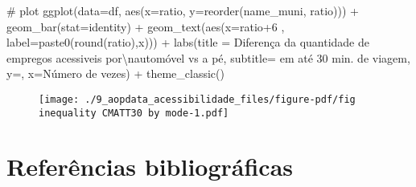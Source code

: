 \documentclass[
  letterpaper,
  DIV=11,
  numbers=noendperiod]{scrreprt}
\newenvironment{Shaded}{\begin{snugshade}}{\end{snugshade}}
\newcommand{\AttributeTok}[1]{\textcolor[rgb]{0.40,0.45,0.13}{#1}}
\newcommand{\CommentTok}[1]{\textcolor[rgb]{0.37,0.37,0.37}{#1}}
\newcommand{\DecValTok}[1]{\textcolor[rgb]{0.68,0.00,0.00}{#1}}
\newcommand{\FunctionTok}[1]{\textcolor[rgb]{0.28,0.35,0.67}{#1}}
\newcommand{\NormalTok}[1]{\textcolor[rgb]{0.00,0.23,0.31}{#1}}
\newcommand{\SpecialCharTok}[1]{\textcolor[rgb]{0.37,0.37,0.37}{#1}}
\newcommand{\StringTok}[1]{\textcolor[rgb]{0.13,0.47,0.30}{#1}}
\begin{document}
\begin{Shaded}
\begin{Highlighting}[]
\CommentTok{\# plot}
\FunctionTok{ggplot}\NormalTok{(}\AttributeTok{data=}\NormalTok{df, }\FunctionTok{aes}\NormalTok{(}\AttributeTok{x=}\NormalTok{ratio, }\AttributeTok{y=}\FunctionTok{reorder}\NormalTok{(name\_muni, ratio))) }\SpecialCharTok{+}
  \FunctionTok{geom\_bar}\NormalTok{(}\AttributeTok{stat=}\StringTok{\textquotesingle{}identity\textquotesingle{}}\NormalTok{) }\SpecialCharTok{+}
  \FunctionTok{geom\_text}\NormalTok{(}\FunctionTok{aes}\NormalTok{(}\AttributeTok{x=}\NormalTok{ratio}\SpecialCharTok{+}\DecValTok{6}\NormalTok{ , }\AttributeTok{label=}\FunctionTok{paste0}\NormalTok{(}\FunctionTok{round}\NormalTok{(ratio),}\StringTok{\textquotesingle{}x\textquotesingle{}}\NormalTok{))) }\SpecialCharTok{+}
  \FunctionTok{labs}\NormalTok{(}\AttributeTok{title =} \StringTok{\textquotesingle{}Diferença da quantidade de empregos acessiveis por}\SpecialCharTok{\textbackslash{}n}\StringTok{automóvel vs a pé\textquotesingle{}}\NormalTok{,}
       \AttributeTok{subtitle=} \StringTok{\textquotesingle{}em até 30 min. de viagem\textquotesingle{}}\NormalTok{,}
       \AttributeTok{y=}\StringTok{\textquotesingle{}\textquotesingle{}}\NormalTok{, }\AttributeTok{x=}\StringTok{\textquotesingle{}Número de vezes\textquotesingle{}}\NormalTok{) }\SpecialCharTok{+}
  \FunctionTok{theme\_classic}\NormalTok{() }
\end{Highlighting}
\end{Shaded}

\begin{figure}[H]

{\centering \texttt{[image: ./9\_aopdata\_acessibilidade\_files/figure-pdf/fig inequality CMATT30 by mode-1.pdf]}

}

\end{figure}

\hypertarget{referuxeancias-bibliogruxe1ficas}{%
\chapter*{Referências
bibliográficas}\label{referuxeancias-bibliogruxe1ficas}}
\end{document}
